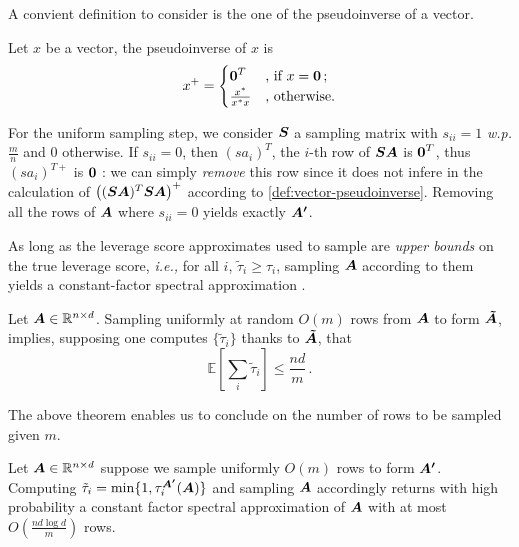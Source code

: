 \begin{proofEnd}
A convient definition to consider is the one of the pseudoinverse of a vector.
\begin{definition}\label{def:vector-pseudoinverse}
   Let $x$ be a vector, the pseudoinverse of $x$ is
   $$
   x^+ = \begin{cases}
    \boldsymbol 0^T & \text{, if } x = \boldsymbol 0 \, ;\\
    \frac{x^*}{x^*x} & \text{, otherwise.}
   \end{cases}
   $$
\end{definition}

For the uniform sampling step, we consider $\boldsymbol S$ a sampling matrix with
$s_{ii} = 1$ \textit{w.p.} $\frac{m}{n}$ and $0$ otherwise. If $s_{ii} = 0$,
then $(sa_{i})^T$, the $i$-th row of $\boldsymbol{SA}$ is $\boldsymbol 0^T$, thus
$(sa_{i})^{T+}$ is $\boldsymbol 0$ : we can simply \emph{remove} this row since it does
not infere in the calculation of $\big((\boldsymbol{SA})^T\boldsymbol{SA}\big)^+$ according to
\autoref{def:vector-pseudoinverse}. Removing all the rows of $\boldsymbol A$ where $s_{ii}
= 0$ yields exactly $\boldsymbol{A'}$.
\end{proofEnd}
As long as the leverage score approximates used to sample are \textit{upper
bounds} on the true leverage score, \textit{i.e.,} for all $i$, $\tilde\tau_i
\geq \tau_i$, sampling $\boldsymbol A$ according to them yields a constant-factor spectral
approximation \cite{li_iterative_2013}.

\begin{theorem}
    \label{thm:sum-expectation}
    Let $\boldsymbol A \in \mathbb R^{n\times d}$. Sampling uniformly at random $O(m)$ rows
    from $\boldsymbol A$ to form $\boldsymbol{\tilde A}$, implies, supposing one computes $\{\tilde \tau
    _i\}$ thanks to $\boldsymbol{\tilde A}$, that
    $$
    \mathbb E \left [ \sum_i \tilde \tau_i\right ] \leq \frac{nd}{m} \, .
    $$
\end{theorem}

The above theorem enables us to conclude on the number of rows to be sampled
given $m$.

\begin{theorem} 
    \label{thm:epsilon_spectral_approximation}
    Let $\boldsymbol A \in \mathbb R^{n\times d}$ suppose we sample uniformly $O(m)$ rows
    to form $\boldsymbol{A'}$. Computing $\tilde \tau_i = \min \{1,
    \tau_i^{\boldsymbol{A'}}(\boldsymbol A)\}$ and sampling $\boldsymbol A$ accordingly returns with high
    probability a constant factor spectral approximation of $\boldsymbol A$ with at most $O(\frac{nd\log
    d}{m})$ rows.
\end{theorem}

